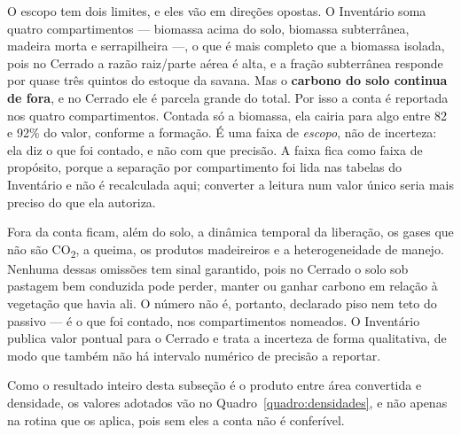 O escopo tem dois limites, e eles vão em direções opostas. O Inventário soma
quatro compartimentos --- biomassa acima do solo, biomassa subterrânea, madeira
morta e serrapilheira ---, o que é mais completo que a biomassa isolada, pois no
Cerrado a razão raiz/parte aérea é alta, e a fração subterrânea responde por
quase três quintos do estoque da savana. Mas o \textbf{carbono do solo continua
de fora}, e no Cerrado ele é parcela grande do total. Por isso a conta é
reportada nos quatro compartimentos. Contada só a biomassa, ela cairia para
algo entre 82 e 92\% do valor, conforme a formação. É uma faixa de \emph{escopo},
não de incerteza: ela diz o que foi contado, e não com que precisão. A
faixa fica como faixa de propósito, porque a separação por compartimento foi
lida nas tabelas do Inventário e não é recalculada aqui; converter a leitura
num valor único seria mais preciso do que ela autoriza.

Fora da conta ficam, além do solo, a dinâmica temporal da liberação, os gases
que não são CO\textsubscript{2}, a queima, os produtos madeireiros e a
heterogeneidade de manejo. Nenhuma dessas omissões tem sinal garantido, pois no
Cerrado o solo sob pastagem bem conduzida pode perder, manter ou ganhar
carbono em relação à vegetação que havia ali. O número não é, portanto,
declarado piso nem teto do passivo --- é o que foi contado, nos
compartimentos nomeados. O Inventário publica valor pontual para o Cerrado e
trata a incerteza de forma qualitativa, de modo que também não há intervalo
numérico de precisão a reportar.

Como o resultado inteiro desta subseção é o produto entre área convertida e
densidade, os valores adotados vão no Quadro~\ref{quadro:densidades}, e não
apenas na rotina que os aplica, pois sem eles a conta não é conferível.

